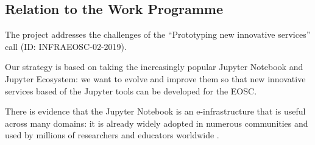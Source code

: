 %

\subsection{Relation to the Work Programme}

The \TheProject project addresses the challenges of the ``Prototyping
new innovative services'' call (ID: INFRAEOSC-02-2019).

Our strategy is based on taking the increasingly popular Jupyter
Notebook and Jupyter Ecosystem: we want to evolve and improve them
so that new innovative services based of the Jupyter tools can be developed for
the EOSC. 
\medskip

There is evidence that the Jupyter Notebook is an e-infrastructure
that is useful across many domains: it is already widely adopted in
numerous communities and used by millions of researchers and educators worldwide
\cite{jupyter-grant}.

